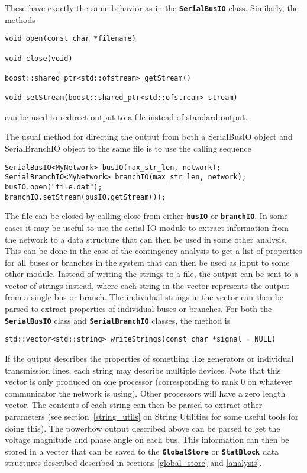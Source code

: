 These have exactly the same behavior as in the \texttt{\textbf{SerialBusIO}} class. Similarly, the methods

{
\color{red}
\begin{Verbatim}[fontseries=b]
void open(const char *filename)

void close(void)

boost::shared_ptr<std::ofstream> getStream()

void setStream(boost::shared_ptr<std::ofstream> stream)
\end{Verbatim}
}

can be used to redirect output to a file instead of standard output.

The usual method for directing the output from both a SerialBusIO object and SerialBranchIO object to the same file is to use the calling sequence

{
\color{red}
\begin{Verbatim}[fontseries=b]
SerialBusIO<MyNetwork> busIO(max_str_len, network);
SerialBranchIO<MyNetwork> branchIO(max_str_len, network);
busIO.open("file.dat");
branchIO.setStream(busIO.getStream());
\end{Verbatim}
}

The file can be closed by calling close from either \texttt{\textbf{busIO}} or \texttt{\textbf{branchIO}}.
In some cases it may be useful to use the serial IO module to extract information from the network to a data structure that can then be used in some other analysis. This can be done in the case of the contingency analysis to get a list of properties for all buses or branches in the system that can then be used as input to some other module. Instead of writing the strings to a file, the output can be sent to a vector of strings instead, where each string in the vector represents the output from a single bus or branch. The individual strings in the vector can then be parsed to extract properties of individual buses or branches. For both the \texttt{\textbf{SerialBusIO}} class and \texttt{\textbf{SerialBranchIO}} classes, the method is

{
\color{red}
\begin{Verbatim}[fontseries=b]
std::vector<std::string> writeStrings(const char *signal = NULL)
\end{Verbatim}
}

If the output describes the properties of something like generators or
individual transmission lines, each string may describe multiple devices. Note
that this vector is only produced on one processor (corresponding to rank 0 on
whatever communicator the network is using). Other processors will have a zero
length vector. The contents of each string can then be parsed to extract other
parameters (see section~\ref{string_utils} on String Utilities for some useful tools for doing
this). The powerflow output described above can be parsed to get the voltage
magnitude and phase angle on each bus. This information can then be stored in a
vector that can be saved to the \texttt{\textbf{GlobalStore}} or
\texttt{\textbf{StatBlock}} data structures described described in sections
\ref{global_store} and \ref{analysis}.
